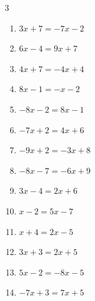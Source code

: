 \begin{multicols}{3}
\begin{enumerate}
  \item $3x+7=-7x-2$


  \item $6x-4=9x+7$


  \item $4x+7=-4x+4$


  \item $8x-1=-x-2$


  \item $-8x-2=8x-1$


  \item $-7x+2=4x+6$


  \item $-9x+2=-3x+8$

        \phantom{$\displaystyle x=-1$}

  \item $-8x-7=-6x+9$

        \phantom{$\displaystyle x=-8$}

  \item $3x-4=2x+6$

        \phantom{$\displaystyle x=10$}

  \item $x-2=5x-7$


\columnbreak %

\resetques

  \item $x+4=2x-5$

        \phantom{$\displaystyle x=9$}

  \item $3x+3=2x+5$

        \phantom{$\displaystyle x=2$}

  \item $5x-2=-8x-5$


  \item $-7x+3=7x+5$


\end{enumerate}
\end{multicols}
